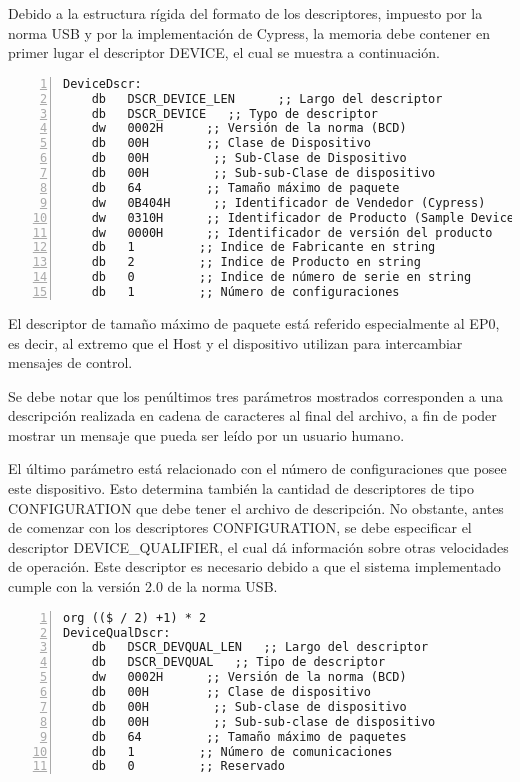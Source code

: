	Debido a la estructura rígida del formato de los descriptores, impuesto por la norma USB y por la implementación de Cypress, la memoria debe contener en primer lugar el descriptor DEVICE, el cual se muestra a continuación.
	
	\begin{lstlisting}[language={[x86masm]Assembler},backgroundcolor=\color{gray!30},numbers=left]
DeviceDscr:
	db   DSCR_DEVICE_LEN      ;; Largo del descriptor
	db   DSCR_DEVICE   ;; Typo de descriptor
	dw   0002H      ;; Versión de la norma (BCD)
	db   00H        ;; Clase de Dispositivo
	db   00H         ;; Sub-Clase de Dispositivo
	db   00H         ;; Sub-sub-Clase de dispositivo
	db   64         ;; Tamaño máximo de paquete
	dw   0B404H      ;; Identificador de Vendedor (Cypress) 
	dw   0310H      ;; Identificador de Producto (Sample Device)
	dw   0000H      ;; Identificador de versión del producto
	db   1         ;; Indice de Fabricante en string
	db   2         ;; Indice de Producto en string
	db   0         ;; Indice de número de serie en string
	db   1         ;; Número de configuraciones
	\end{lstlisting}
	
	El descriptor de tamaño máximo de paquete está referido especialmente al EP0, es decir, al extremo que el Host y el dispositivo utilizan para intercambiar mensajes de control.
	
	Se debe notar que los penúltimos tres parámetros mostrados corresponden a una descripción realizada en cadena de caracteres al final del archivo, a fin de poder mostrar un mensaje que pueda ser leído por un usuario humano.
	
	El último parámetro está relacionado con el número de configuraciones que posee este dispositivo. Esto determina también la cantidad de descriptores de tipo CONFIGURATION que debe tener el archivo de descripción. No obstante, antes de comenzar con los descriptores CONFIGURATION, se debe especificar el descriptor DEVICE\_QUALIFIER, el cual dá información sobre otras velocidades de operación. Este descriptor es necesario debido a que el sistema implementado cumple con la versión 2.0 de la norma USB.
	
	\begin{lstlisting}[language={[x86masm]Assembler},backgroundcolor=\color{gray!30},numbers=left]
org (($ / 2) +1) * 2
DeviceQualDscr:
	db   DSCR_DEVQUAL_LEN   ;; Largo del descriptor
	db   DSCR_DEVQUAL   ;; Tipo de descriptor
	dw   0002H      ;; Versión de la norma (BCD)
	db   00H        ;; Clase de dispositivo
	db   00H         ;; Sub-clase de dispositivo
	db   00H         ;; Sub-sub-clase de dispositivo
	db   64         ;; Tamaño máximo de paquetes
	db   1         ;; Número de comunicaciones
	db   0         ;; Reservado
	\end{lstlisting}
	
